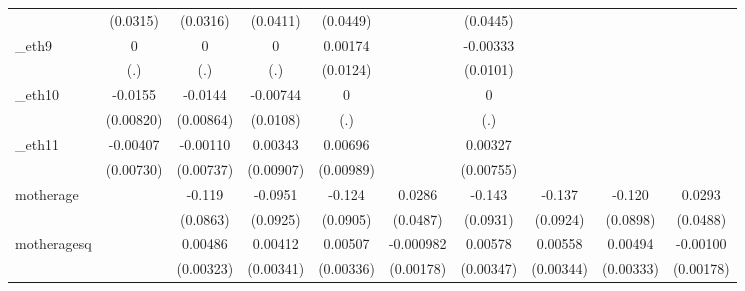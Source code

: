 \begin{table}[htbp]
\begin{tabular}{l*{9}{c}}
            &    (0.0315)         &    (0.0316)         &    (0.0411)         &    (0.0449)         &                     &    (0.0445)         &                     &                     &                     \\
[1em]
\_eth9       &           0         &           0         &           0         &     0.00174         &                     &    -0.00333         &                     &                     &                     \\
            &         (.)         &         (.)         &         (.)         &    (0.0124)         &                     &    (0.0101)         &                     &                     &                     \\
[1em]
\_eth10      &     -0.0155\sym{*}  &     -0.0144\sym{*}  &    -0.00744         &           0         &                     &           0         &                     &                     &                     \\
            &   (0.00820)         &   (0.00864)         &    (0.0108)         &         (.)         &                     &         (.)         &                     &                     &                     \\
[1em]
\_eth11      &    -0.00407         &    -0.00110         &     0.00343         &     0.00696         &                     &     0.00327         &                     &                     &                     \\
            &   (0.00730)         &   (0.00737)         &   (0.00907)         &   (0.00989)         &                     &   (0.00755)         &                     &                     &                     \\
[1em]
motherage   &                     &      -0.119         &     -0.0951         &      -0.124         &      0.0286         &      -0.143         &      -0.137         &      -0.120         &      0.0293         \\
            &                     &    (0.0863)         &    (0.0925)         &    (0.0905)         &    (0.0487)         &    (0.0931)         &    (0.0924)         &    (0.0898)         &    (0.0488)         \\
[1em]
motheragesq &                     &     0.00486         &     0.00412         &     0.00507         &   -0.000982         &     0.00578\sym{*}  &     0.00558         &     0.00494         &    -0.00100         \\
            &                     &   (0.00323)         &   (0.00341)         &   (0.00336)         &   (0.00178)         &   (0.00347)         &   (0.00344)         &   (0.00333)         &   (0.00178)         \\

\end{tabular}
\end{table}
